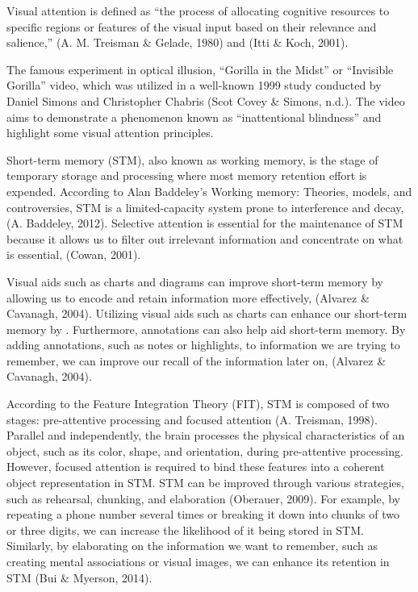 \documentclass[print]{nuthesis}
\begin{document}
Visual attention is defined as ``the process of allocating cognitive resources to specific regions or features of the visual input based on their relevance and salience,'' (A. M. Treisman \& Gelade, 1980) and (Itti \& Koch, 2001).

The famous experiment in optical illusion, ``Gorilla in the Midst'' or ``Invisible Gorilla'' video, which was utilized in a well-known 1999 study conducted by Daniel Simons and Christopher Chabris (Scot Covey \& Simons, n.d.). The video aims to demonstrate a phenomenon known as ``inattentional blindness'' and highlight some visual attention principles.

Short-term memory (STM), also known as working memory, is the stage of temporary storage and processing where most memory retention effort is expended.
According to Alan Baddeley's Working memory: Theories, models, and controversies, STM is a limited-capacity system prone to interference and decay, (A. Baddeley, 2012).
Selective attention is essential for the maintenance of STM because it allows us to filter out irrelevant information and concentrate on what is essential, (Cowan, 2001).

Visual aids such as charts and diagrams can improve short-term memory by allowing us to encode and retain information more effectively, (Alvarez \& Cavanagh, 2004).
Utilizing visual aids such as charts can enhance our short-term memory by .
Furthermore, annotations can also help aid short-term memory.
By adding annotations, such as notes or highlights, to information we are trying to remember, we can improve our recall of the information later on, (Alvarez \& Cavanagh, 2004).

According to the Feature Integration Theory (FIT), STM is composed of two stages: pre-attentive processing and focused attention (A. Treisman, 1998).
Parallel and independently, the brain processes the physical characteristics of an object, such as its color, shape, and orientation, during pre-attentive processing.
However, focused attention is required to bind these features into a coherent object representation in STM.
STM can be improved through various strategies, such as rehearsal, chunking, and elaboration (Oberauer, 2009).
For example, by repeating a phone number several times or breaking it down into chunks of two or three digits, we can increase the likelihood of it being stored in STM.
Similarly, by elaborating on the information we want to remember, such as creating mental associations or visual images, we can enhance its retention in STM (Bui \& Myerson, 2014).
\end{document}
